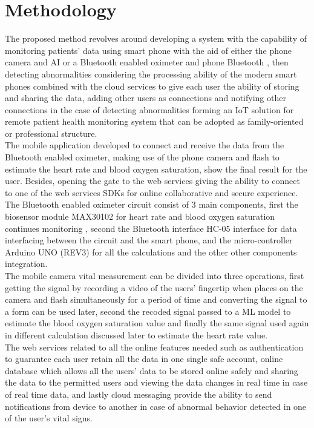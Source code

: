 \documentclass{bmcart}
\begin{document}
\section*{Methodology}
The proposed method revolves around developing a system with the capability of
monitoring patients’ data using smart phone with the aid of either the phone
camera and AI or a Bluetooth enabled oximeter and phone Bluetooth , then
detecting abnormalities considering the processing ability of the modern smart
phones combined with the cloud services to give each user the ability of storing
and sharing the data, adding other users as connections and notifying other
connections in the case of detecting abnormalities forming an IoT solution for
remote patient health monitoring system that can be adopted as family-oriented
or professional structure.\\
The mobile application developed to connect and receive the data from the
Bluetooth enabled oximeter, making use of the phone camera and flash to estimate
the heart rate and blood oxygen saturation, show the final result for the user.
Besides, opening the gate to the web services giving the ability to connect to
one of the web services SDKs for online collaborative and secure experience.\\
The Bluetooth enabled oximeter circuit consist of 3 main components, first the
biosensor module MAX30102 for heart rate and blood oxygen saturation continues
monitoring \cite{max30102}, second the Bluetooth interface HC-05 interface for data
interfacing between the circuit and the smart phone, and the micro-controller
Arduino UNO (REV3) for all the calculations and the other other components
integration.\\
The mobile camera vital measurement can be divided into three operations, first
getting the signal by recording a video of the users’ fingertip when places on
the camera and flash simultaneously for a period of time and converting the
signal to a form can be used later, second the recoded signal passed to a ML
model to estimate the blood oxygen saturation value and finally the same signal
used again in different calculation discussed later to estimate the heart rate
value.\\
The web services related to all the online features needed such as
authentication to  guarantee each user retain all the data in one single safe
account, online database which allows all the users’ data to be stored online
safely and sharing the data to the permitted users and viewing the data changes
in real time in case of real time data, and  lastly cloud messaging provide the
ability to send notifications from device to another in case of abnormal
behavior detected in one of the user’s vital signs.\\
\end{document}
